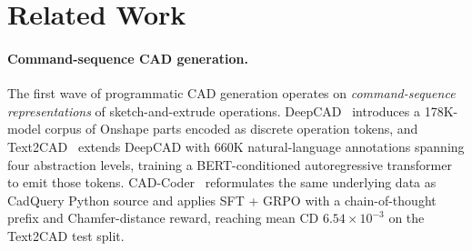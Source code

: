 \documentclass{article}
\begin{document}
\section{Related Work}
\label{sec:related}

\paragraph{Command-sequence CAD generation.}
The first wave of programmatic CAD generation operates on \emph{command-sequence representations} of sketch-and-extrude operations. DeepCAD~\citep{Wu2021} introduces a 178K-model corpus of Onshape parts encoded as discrete operation tokens, and Text2CAD~\citep{Khan2024} extends DeepCAD with 660K natural-language annotations spanning four abstraction levels, training a BERT-conditioned autoregressive transformer to emit those tokens. CAD-Coder~\citep{Guan2025} reformulates the same underlying data as CadQuery Python source and applies SFT + GRPO with a chain-of-thought prefix and Chamfer-distance reward, reaching mean CD $6.54\!\times\!10^{-3}$ on the Text2CAD test split.
\end{document}
